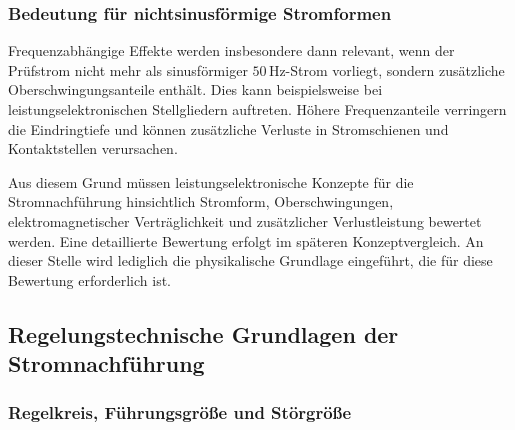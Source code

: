 \subsubsection{Bedeutung für nichtsinusförmige Stromformen}
\label{sec:nichtsinusform_strom}

Frequenzabhängige Effekte werden insbesondere dann relevant, wenn der Prüfstrom nicht mehr als sinusförmiger $50\,\mathrm{Hz}$-Strom vorliegt, sondern zusätzliche Oberschwingungsanteile enthält. Dies kann beispielsweise bei leistungselektronischen Stellgliedern auftreten. Höhere Frequenzanteile verringern die Eindringtiefe und können zusätzliche Verluste in Stromschienen und Kontaktstellen verursachen.

Aus diesem Grund müssen leistungselektronische Konzepte für die Stromnachführung hinsichtlich Stromform, Oberschwingungen, elektromagnetischer Verträglichkeit und zusätzlicher Verlustleistung bewertet werden. Eine detaillierte Bewertung erfolgt im späteren Konzeptvergleich. An dieser Stelle wird lediglich die physikalische Grundlage eingeführt, die für diese Bewertung erforderlich ist.    
    

\subsection{Regelungstechnische Grundlagen der Stromnachführung}
\label{sec:regelung_grundlagen}


\subsubsection{Regelkreis, Führungsgröße und Störgröße}
\label{sec:regelkreis_stoergroesse}


